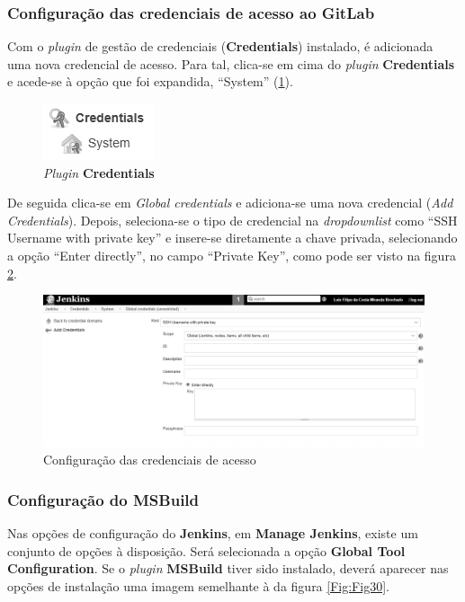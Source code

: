 \subsubsection{Configuração das credenciais de acesso ao GitLab}

\hspace{1cm}Com o \textit{plugin} de gestão de credenciais (\textbf{Credentials}) instalado, é adicionada uma nova credencial de acesso. Para tal, clica-se em cima do \textit{plugin} \textbf{Credentials} e acede-se à opção que foi expandida, ``System'' (\ref{Fig:Fig28}).

\begin{figure}[hbt!]
\centering
\includegraphics[width=0.15\linewidth]{Cap5/JenkinsCredentials.png}
\caption{\textit{Plugin} \textbf{Credentials}}
\label{Fig:Fig28}
\end{figure}

\hspace{1cm}De seguida clica-se em \textit{Global credentials} e adiciona-se uma nova credencial (\textit{Add Credentials}). Depois, seleciona-se o tipo de credencial na \textit{dropdownlist} como ``SSH Username with private key'' e insere-se diretamente a chave privada, selecionando a opção ``Enter directly'', no campo ``Private Key'', como pode ser visto na figura \ref{Fig:Fig29}.

\begin{figure}[hbt!]
\centering
\includegraphics[width=0.9\linewidth]{Cap5/JenkinsCredentialsConfig.png}
\caption{Configuração das credenciais de acesso}
\label{Fig:Fig29}
\end{figure}

\subsubsection{Configuração do \textbf{MSBuild}}

\hspace{1cm}Nas opções de configuração do \textbf{Jenkins}, em \textbf{Manage Jenkins}, existe um conjunto de opções à disposição. Será selecionada a opção \textbf{Global Tool Configuration}. Se o \textit{plugin} \textbf{MSBuild} tiver sido instalado, deverá aparecer nas opções de instalação uma imagem semelhante à da figura \ref{Fig:Fig30}. 

